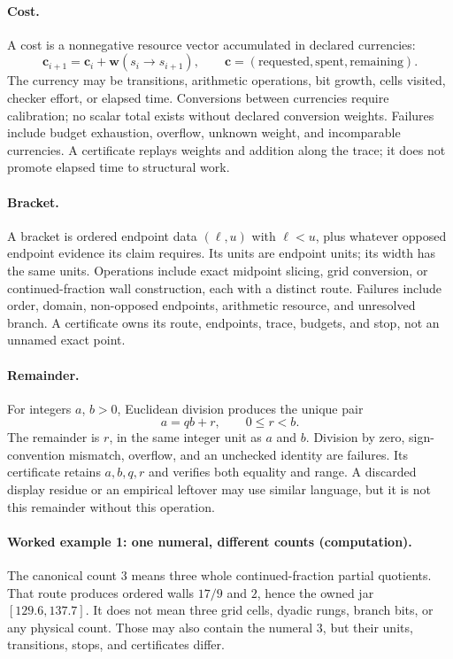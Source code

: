 \paragraph{Cost.}
A cost is a nonnegative resource vector accumulated in declared currencies:
\[
 \mathbf c_{i+1}=\mathbf c_i+\mathbf w(s_i\to s_{i+1}),\qquad
 \mathbf c=(\text{requested},\text{spent},\text{remaining}).
\]
The currency may be transitions, arithmetic operations, bit growth, cells visited, checker effort, or elapsed time.
Conversions between currencies require calibration; no scalar total exists without declared conversion weights.
Failures include budget exhaustion, overflow, unknown weight,
and incomparable currencies.  A certificate replays weights and addition along the trace; it does not promote elapsed
time to structural work.

\paragraph{Bracket.}
A bracket is ordered endpoint data \((\ell,u)\) with \(\ell<u\), plus whatever opposed endpoint evidence its claim
requires.  Its units are endpoint units; its width has the same units.  Operations include exact midpoint slicing,
grid conversion, or continued-fraction wall construction, each with a distinct route.  Failures include order,
domain, non-opposed endpoints, arithmetic resource, and unresolved branch.  A certificate owns its route, endpoints,
trace, budgets, and stop, not an unnamed exact point.

\paragraph{Remainder.}
For integers \(a\), \(b>0\), Euclidean division produces the unique pair
\[
                        a=qb+r,\qquad 0\leq r<b.
\]
The remainder is \(r\), in the same integer unit as \(a\) and \(b\).  Division by zero, sign-convention mismatch,
overflow, and an unchecked identity are failures.  Its certificate retains \(a,b,q,r\) and verifies both equality and
range.  A discarded display residue or an empirical leftover may use similar language, but it is not this remainder
without this operation.

\paragraph{Worked example 1: one numeral, different counts (computation).}
The canonical count \(3\) means three whole continued-fraction partial quotients.  That route produces ordered walls
\(17/9\) and \(2\), hence the owned jar \([129.6,137.7]\).  It does not mean three grid cells, dyadic rungs, branch
bits, or any physical count.  Those may also contain the numeral \(3\), but their units, transitions, stops, and
certificates differ.

